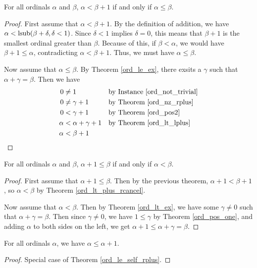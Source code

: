 \documentclass[../../math.tex]{subfiles}
\begin{document}
\begin{theorem} \label{ord_lt_suc_le}
    For all ordinals $\alpha$ and $\beta$, $\alpha < \beta + 1$ if and only if
    $\alpha \leq \beta$.
\end{theorem}
\begin{proof}
    First assume that $\alpha < \beta + 1$.  By the definition of addition, we
    have $\alpha < \operatorname{lsub}(\beta + \delta, \delta < 1)$.  Since $\delta < 1$
    implies $\delta = 0$, this means that $\beta + 1$ is the smallest ordinal
    greater than $\beta$.  Because of this, if $\beta < \alpha$, we would have
    $\beta + 1 \leq \alpha$, contradicting $\alpha < \beta + 1$.  Thus, we must
    have $\alpha \leq \beta$.

    Now assume that $\alpha \leq \beta$.  By Theorem \ref{ord_le_ex}, there
    exsits a $\gamma$ such that $\alpha + \gamma = \beta$.  Then we have
    \begin{align*}
        0 &\neq 1 && \text{by Instance \ref{ord_not_trivial}} \\
        0 &\neq \gamma + 1 && \text{by Theorem \ref{ord_nz_rplus}} \\
        0 &< \gamma + 1 && \text{by Theorem \ref{ord_pos2}} \\
        \alpha &< \alpha + \gamma + 1 && \text{by Theorem \ref{ord_lt_lplus}} \\
        \alpha &< \beta + 1 &&
    \end{align*}
\end{proof}

\begin{theorem} \label{ord_le_suc_lt}
    For all ordinals $\alpha$ and $\beta$, $\alpha + 1 \leq \beta$ if and only
    if $\alpha < \beta$.
\end{theorem}
\begin{proof}
    First assume that $\alpha + 1 \leq \beta$.  Then by the previous theorem,
    $\alpha + 1 < \beta + 1$, so $\alpha < \beta$ by Theorem
    \ref{ord_lt_plus_rcancel}.

    Now assume that $\alpha < \beta$.  Then by Theorem \ref{ord_lt_ex}, we have
    some $\gamma \neq 0$ such that $\alpha + \gamma = \beta$.  Then since
    $\gamma \neq 0$, we have $1 \leq \gamma$ by Theorem \ref{ord_pos_one}, and
    adding $\alpha$ to both sides on the left, we get $\alpha + 1 \leq \alpha +
    \gamma = \beta$.
\end{proof}

\begin{theorem} \label{ord_le_suc}
    For all ordinals $\alpha$, we have $\alpha \leq \alpha + 1$.
\end{theorem}
\begin{proof}
    Special case of Theorem \ref{ord_le_self_rplus}.
\end{proof}
\end{document}
